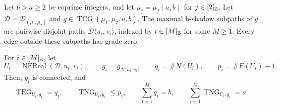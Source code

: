\begin{lemma}\label{lem:frame-shadow-decomposition}
Let $b>a\ge2$ be coprime integers, and let $\mu_j=\mu_j(a,b)$ for $j\in[2]_{\mathbb Z}$.
Let $\mathcal D=\mathcal D_{(\mu_1,\mu_2)}$ and $g\in\operatorname{TCG}(\mu_1,\mu_2,a,b)$.
The maximal h-shadow subpaths of $g$ are pairwise disjoint paths
$\mathcal D\langle u_i,v_i\rangle$, indexed by $i\in[M]_{\mathbb Z}$ for some $M\ge1$.
Every edge outside these subpaths has grade zero.

For $i\in[M]_{\mathbb Z}$, let
\[
 U_i=\operatorname{NEReal}(\mathcal D,u_i,v_i),\qquad
 g_i=g_{\mathcal D,u_i,v_i},\qquad
 q_i=\#N(U_i),\qquad p_i=\#E(U_i)-1.
\]
Then, $g_i$ is connected, and
\[
 \operatorname{TEG}_{U_i,g_i}=q_i,\qquad
 \operatorname{TNG}_{U_i,g_i}\le p_i,\qquad
 \sum_{i=1}^{M}q_i=b,\qquad
 \sum_{i=1}^{M}\operatorname{TNG}_{U_i,g_i}=a.
\]
\end{lemma}
